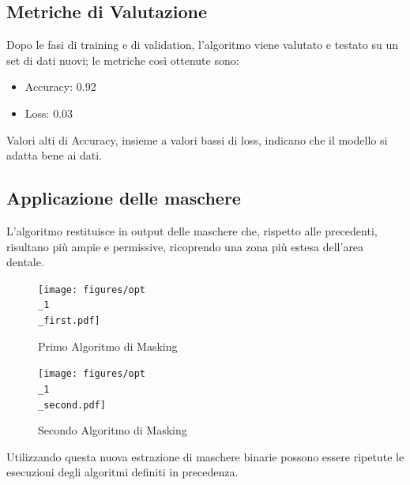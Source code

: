 \documentclass[12pt,a4paper,openright,twoside]{book}
\begin{document}
\subsection{Metriche di Valutazione}
Dopo le fasi di training e di validation, l'algoritmo viene valutato e testato su un set di dati nuovi; le metriche così ottenute sono:
\begin{itemize}
\item Accuracy: 0.92
\item Loss: 0.03
\end{itemize}

Valori alti di Accuracy, insieme a valori bassi di loss, indicano che il modello si adatta bene ai dati.

\subsection{Applicazione delle maschere}
L'algoritmo restituisce in output delle maschere che, rispetto alle precedenti, risultano più ampie e permissive, ricoprendo una zona più estesa dell'area dentale.
\begin{figure}[H]
    \centering
    \begin{minipage}{0.45\textwidth}
	\centering
    	\texttt{[image: figures/opt\\\_1\\\_first.pdf]}
    	\caption{Primo Algoritmo di Masking}
    	\label{lab:Maschera 2 opt1}
    \end{minipage}\hfill
    \begin{minipage}{0.45\textwidth}
    	\centering
    	\texttt{[image: figures/opt\\\_1\\\_second.pdf]}
    	\caption{Secondo Algoritmo di Masking}
    	\label{lab:Maschera 1 opt1}
    \end{minipage}\hfill
\end{figure}

Utilizzando questa nuova estrazione di maschere binarie possono essere ripetute le esecuzioni degli algoritmi definiti in precedenza.\\
\end{document}
